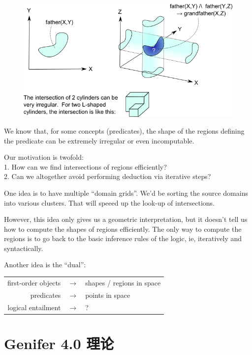 \begin{figure}[H]
\centering
\includegraphics[scale=1.0]{cylindrical-logic.png}
\end{figure}

We know that, for some concepts (predicates), the shape of the regions defining the predicate can be extremely irregular or even incomputable.

Our motivation is twofold:\\
1. How can we find intersections of regions efficiently?\\
2. Can we altogether avoid performing deduction via iterative steps?

One idea is to have multiple ``domain grids''.  We'd be sorting the source domains into various clusters.  That will speeed up the look-up of intersections.

However, this idea only gives us a geometric interpretation, but it doesn't tell us how to compute the shapes of regions efficiently.  The only way to compute the regions is to go back to the basic inference rules of the logic, ie, iteratively and syntactically.

Another idea is the ``dual'':

\tab \begin{tabular}{rll}
first-order objects & $\longrightarrow$ & shapes / regions in space\\
predicates          & $\longrightarrow$ & points in space\\
logical entailment  & $\longrightarrow$ & ?\\
\end{tabular}

\section{Genifer 4.0 理论}


